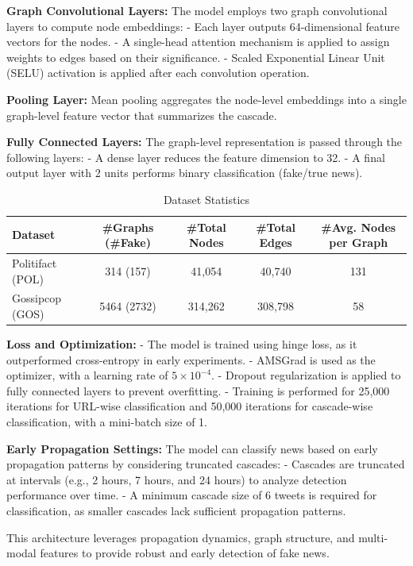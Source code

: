 \documentclass[sigconf,nonacm]{acmart}
\begin{document}
\textbf{Graph Convolutional Layers:}  
The model employs two graph convolutional layers to compute node embeddings:
- Each layer outputs 64-dimensional feature vectors for the nodes.
- A single-head attention mechanism is applied to assign weights to edges based on their significance.
- Scaled Exponential Linear Unit (SELU) activation is applied after each convolution operation.

\textbf{Pooling Layer:}  
Mean pooling aggregates the node-level embeddings into a single graph-level feature vector that summarizes the cascade.

\textbf{Fully Connected Layers:}  
The graph-level representation is passed through the following layers:
- A dense layer reduces the feature dimension to 32.
- A final output layer with 2 units performs binary classification (fake/true news).
\begin{table}[t]
    \centering
    \caption{Dataset Statistics}
    \begin{tabular}{lcccc}
        \toprule
        \textbf{Dataset} & \textbf{\#Graphs (\#Fake)} & \textbf{\#Total Nodes} & \textbf{\#Total Edges} & \textbf{\#Avg. Nodes per Graph} \\
        \midrule
        Politifact (POL) & 314 (157) & 41,054 & 40,740 & 131 \\
        Gossipcop (GOS)  & 5464 (2732) & 314,262 & 308,798 & 58 \\
        \bottomrule
    \end{tabular}
    \label{tab:data_statistics}
\end{table}
\textbf{Loss and Optimization:}  
- The model is trained using hinge loss, as it outperformed cross-entropy in early experiments.
- AMSGrad is used as the optimizer, with a learning rate of \( 5 \times 10^{-4} \).
- Dropout regularization is applied to fully connected layers to prevent overfitting.
- Training is performed for 25,000 iterations for URL-wise classification and 50,000 iterations for cascade-wise classification, with a mini-batch size of 1.

\textbf{Early Propagation Settings:}  
The model can classify news based on early propagation patterns by considering truncated cascades:
- Cascades are truncated at intervals (e.g., 2 hours, 7 hours, and 24 hours) to analyze detection performance over time.
- A minimum cascade size of 6 tweets is required for classification, as smaller cascades lack sufficient propagation patterns.

This architecture leverages propagation dynamics, graph structure, and multi-modal features to provide robust and early detection of fake news.
\end{document}

